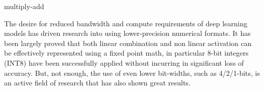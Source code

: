 multiply-add \cite{62143}


The desire for reduced bandwidth and compute requirements of deep learning models has driven research into using lower-precision numerical formats. It has been largely proved that both linear combination and non linear activation can be effectively represented using a fixed point math, in particular 8-bit integers (INT8) have been successfully applied without incurring in significant loss of accuracy. 
But, not enough, the use of even lower bit-widths, such as 4/2/1-bits, is an active field of research that has also shown great results.


















